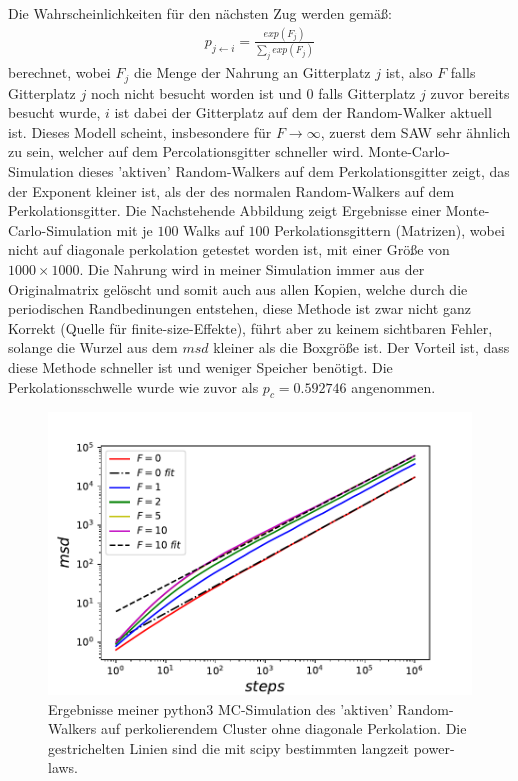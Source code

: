 \documentclass[a4paper, 12pt]{report}
\begin{document}
\noindent Die Wahrscheinlichkeiten für den nächsten Zug werden gemäß:
\begin{align}
p_{j \leftarrow i} = \frac{exp({F_j})}{\sum_j exp({F_j})}
\end{align}
berechnet, wobei $F_j$ die Menge der Nahrung an Gitterplatz $j$ ist, also $F$ falls Gitterplatz $j$ noch nicht besucht worden ist und $0$ falls Gitterplatz $j$ zuvor bereits besucht wurde, $i$ ist dabei der Gitterplatz auf dem der Random-Walker aktuell ist. Dieses Modell scheint, insbesondere für $F \rightarrow \infty$, zuerst dem SAW sehr ähnlich zu sein, welcher auf dem Percolationsgitter schneller wird. Monte-Carlo-Simulation dieses 'aktiven' Random-Walkers auf dem Perkolationsgitter zeigt, das der Exponent kleiner ist, als der des normalen Random-Walkers auf dem Perkolationsgitter. Die Nachstehende Abbildung zeigt Ergebnisse einer Monte-Carlo-Simulation mit je $100$ Walks auf $100$ Perkolationsgittern (Matrizen), wobei nicht auf diagonale perkolation getestet worden ist, mit einer Größe von $1000 \times 1000$. Die Nahrung wird in meiner Simulation immer aus der Originalmatrix gelöscht und somit auch aus allen Kopien, welche durch die periodischen Randbedinungen entstehen, diese Methode ist zwar nicht ganz Korrekt (Quelle für finite-size-Effekte), führt aber zu keinem sichtbaren Fehler, solange die Wurzel aus dem $msd$ kleiner als die Boxgröße ist. Der Vorteil ist, dass diese Methode schneller ist und weniger Speicher benötigt. Die Perkolationsschwelle wurde wie zuvor als $p_c=0.592746$ angenommen.
\begin{figure}[h!]
	\centering
	\includegraphics[scale=0.9]{food.pdf}
	\caption{Ergebnisse meiner python3 MC-Simulation des 'aktiven' Random-Walkers auf perkolierendem Cluster ohne diagonale Perkolation. Die gestrichelten Linien sind die mit scipy bestimmten langzeit power-laws.}
\end{figure}
\newpage
\end{document}
